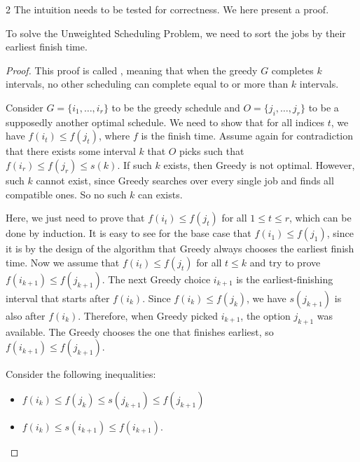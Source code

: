 \begin{multicols}{2}
    The intuition needs to be tested for correctness. We here present a proof. 
    \begin{prop}
        To solve the Unweighted Scheduling Problem, we need to sort the jobs by their earliest finish time. 
    \end{prop}
    \begin{proof}
        This proof is called , meaning that when the greedy $G$ completes $k$ intervals, no other scheduling can complete equal to or more than $k$ intervals. 
        
        Consider $G = \{i_1, \ldots, i_r\}$ to be the greedy schedule and $O = \{j_i,\ldots, j_r\}$ to be a supposedly another optimal schedule. We need to show that for all indices $t$, we have $f(i_t) \leq f(j_t)$, where $f$ is the finish time. Assume again for contradiction that there exists some interval $k$ that $O$ picks such that $f(i_r) \leq f(j_r) \leq s(k)$. If such $k$ exists, then Greedy is not optimal. However, such $k$ cannot exist, since Greedy searches over every single job and finds all compatible ones. So no such $k$ can exists. 

        Here, we just need to prove that $f(i_t) \leq f(j_t)$ for all $1 \leq t \leq r$, which can be done by induction. It is easy to see for the base case that $f(i_1) \leq f(j_1)$, since it is by the design of the algorithm that Greedy always chooses the earliest finish time. Now we assume that $f(i_t) \leq f(j_t)$ for all $t \leq k$ and try to prove $f(i_{k + 1}) \leq f(j_{k + 1})$. The next Greedy choice $i_{k + 1}$ is the earliest-finishing interval that starts after $f(i_k)$. Since $f(i_k) \leq f(j_k)$, we have $s(j_{k+1})$ is also after $f(i_k)$. Therefore, when Greedy picked $i_{k + 1}$, the option $j_{k + 1}$ was available. The Greedy chooses the one that finishes earliest, so $f(i_{k + 1}) \leq f(j_{k + 1})$. 
        
        
        Consider the following inequalities: 
        \begin{itemize}
            \item $f(i_k) \leq f(j_k) \leq s(j_{k + 1}) \leq f(j_{k + 1})$
            \item $f(i_k) \leq s(i_{k+1}) \leq f(i_{k + 1})$. 
        \end{itemize}
        
    \end{proof}
\end{multicols}

\newpage
